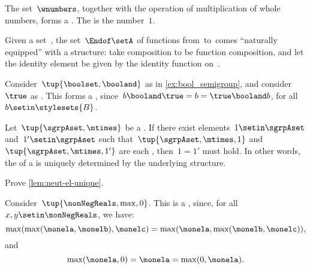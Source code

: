 \begin{example}
    The set~$\wnumbers$, together with the operation of multiplication of whole numbers, forms a .
    The  is the number~$1$.
\end{example}

\begin{example}
    Given a set~\setA, the set~$\Endof\setA$ of functions from~\setA to~\setA comes ``naturally equipped'' with a  structure: take  composition to be function composition, and let the identity element be given by the identity function on~\setA.
\end{example}

\begin{example}
    \label{ex:bool_monoid}
    Consider~$\tup{\boolset,\booland}$ as in \cref{ex:bool_semigroup}, and consider~$\true$ as .
    This forms a , since~$b\booland \true=b=\true \booland b$, for all~$b\setin \stylesets{B}$.
\end{example}

\begin{lemma}
    \label{lem:neut-el-unique}
    Let~$\tup{\sgrpAset, \mtimes}$ be a .
    If there exist elements~$1 \setin \sgrpAset$ and~$1' \setin \sgrpAset$ such that~$\tup{\sgrpAset, \mtimes, 1}$ and~$\tup{\sgrpAset, \mtimes, 1'}$ are each , then~$1 = 1'$ must hold.
    In other words, the  of a  is uniquely determined by the underlying  structure.
\end{lemma}

\begin{gradedexercise}
    \label{ex:UniqueNeutralMonoid}
    Prove \cref{lem:neut-el-unique}.
\end{gradedexercise}


\begin{example}
    Consider~$\tup{\nonNegReals,\max,0}$.
    This is a , since, for all~$x,y\setin \nonNegReals$, we have:
    \begin{equation}
        \max(\max(\monela,\monelb),\monelc)=\max(\monela,\max(\monelb,\monelc)),
    \end{equation}
    and
    \begin{equation}
        \max(\monela,0)=\monela=\max(0,\monela).
    \end{equation}
\end{example}

